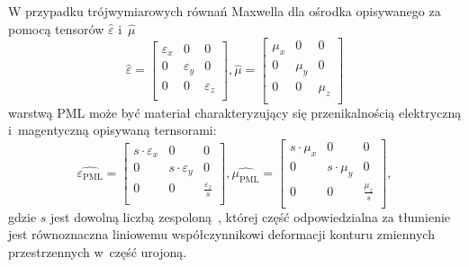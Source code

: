 W przypadku trójwymiarowych równań Maxwella dla ośrodka opisywanego za pomocą tensorów $\hat{\varepsilon}$ i~$\hat{\mu}$ 
\begin{equation}
\hat{\varepsilon}=
\begin{bmatrix}
\varepsilon_x & 0 & 0 \\
0 &\varepsilon_y & 0 \\
0 & 0  & \varepsilon_z  \\
\end{bmatrix}
, \hat{\mu}=
\begin{bmatrix}
\mu_x & 0 & 0 \\
0 &\mu_y & 0 \\
0 & 0  & \mu_z  \\
\end{bmatrix}
\end{equation}
warstwą PML może być materiał charakteryzujący się przenikalnością elektryczną i~magentyczną opisywaną ternsorami:
\begin{equation}
\hat{\varepsilon_{\textrm{PML}}}=
\begin{bmatrix}
s \cdot \varepsilon_x & 0 & 0 \\
0 &s \cdot \varepsilon_y & 0 \\
0 & 0  & \frac{ \varepsilon_z}{s}  \\
\end{bmatrix}
, \hat{\mu_{\textrm{PML}}}=
\begin{bmatrix}
s \cdot \mu_x & 0 & 0 \\
0 & s \cdot \mu_y & 0 \\
0 & 0  & \frac{\mu_z}{s}  \\
\end{bmatrix},
\label{eq:general-pml-form}
\end{equation}
gdzie $s$ jest dowolną liczbą zespoloną~\cite{sacks1995perfectly}, której część odpowiedzialna za tłumienie jest równoznaczna liniowemu współczynnikowi deformacji konturu zmiennych przestrzennych w~część urojoną.


